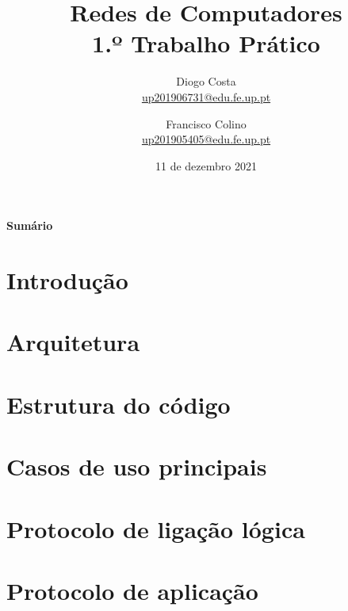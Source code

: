\documentclass[a4paper,11pt,portuguese]{article}
\begin{document}

\author{
    Diogo Costa\\
    \href{mailto:up201906731@edu.fe.up.pt}{up201906731@edu.fe.up.pt}
    \and
    Francisco Colino\\
    \href{mailto:up201905405@edu.fe.up.pt}{up201905405@edu.fe.up.pt}
}
\title{Redes de Computadores \\ 1.º Trabalho Prático}
\date{11 de dezembro 2021}
\maketitle

\begin{center}
    \textbf{Sumário}
\end{center}



\section{Introdução}



\section{Arquitetura}



\section{Estrutura do código}



\section{Casos de uso principais}



\section{Protocolo de ligação lógica}



\section{Protocolo de aplicação}
\end{document}
